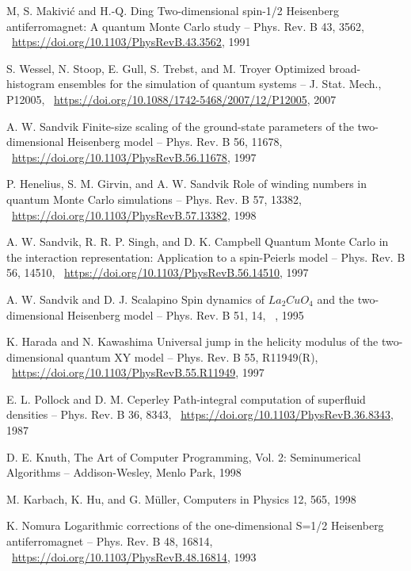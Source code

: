 \documentclass[11pt]{article}
\begin{document}
\begin{thebibliography}{3}
M, S. Makivić and H.-Q. Ding Two-dimensional spin-1/2 Heisenberg antiferromagnet: A quantum Monte Carlo study -- Phys. Rev. B 43, 3562,  ~\url{https://doi.org/10.1103/PhysRevB.43.3562}, 1991

S. Wessel, N. Stoop, E. Gull, S. Trebst, and M. Troyer Optimized broad-histogram ensembles for the simulation of quantum systems -- J. Stat. Mech., P12005,  ~\url{https://doi.org/10.1088/1742-5468/2007/12/P12005}, 2007

A. W. Sandvik Finite-size scaling of the ground-state parameters of the two-dimensional Heisenberg model -- Phys. Rev. B 56, 11678,  ~\url{https://doi.org/10.1103/PhysRevB.56.11678}, 1997

P. Henelius, S. M. Girvin, and A. W. Sandvik Role of winding numbers in quantum Monte Carlo simulations -- Phys. Rev. B 57, 13382,  ~\url{https://doi.org/10.1103/PhysRevB.57.13382}, 1998

A. W. Sandvik, R. R. P. Singh, and D. K. Campbell Quantum Monte Carlo in the interaction representation: Application to a spin-Peierls model -- Phys. Rev. B 56, 14510,  ~\url{https://doi.org/10.1103/PhysRevB.56.14510}, 1997

 A. W. Sandvik and D. J. Scalapino Spin dynamics of $La_2CuO_4$ and the two-dimensional Heisenberg model -- Phys. Rev. B 51, 14,  ~\url{}, 1995
 
K. Harada and N. Kawashima Universal jump in the helicity modulus of the two-dimensional quantum XY model -- Phys. Rev. B 55, R11949(R),  ~\url{https://doi.org/10.1103/PhysRevB.55.R11949}, 1997

E. L. Pollock and D. M. Ceperley Path-integral computation of superfluid densities -- Phys. Rev. B 36, 8343,  ~\url{https://doi.org/10.1103/PhysRevB.36.8343}, 1987

D. E. Knuth, The Art of Computer Programming, Vol. 2: Seminumerical Algorithms -- Addison-Wesley, Menlo Park, 1998

M. Karbach, K. Hu, and G. Müller, Computers in Physics 12, 565, 1998

K. Nomura Logarithmic corrections of the one-dimensional S=1/2 Heisenberg antiferromagnet -- Phys. Rev. B 48, 16814,  ~\url{https://doi.org/10.1103/PhysRevB.48.16814}, 1993


\end{thebibliography}
\end{document}
